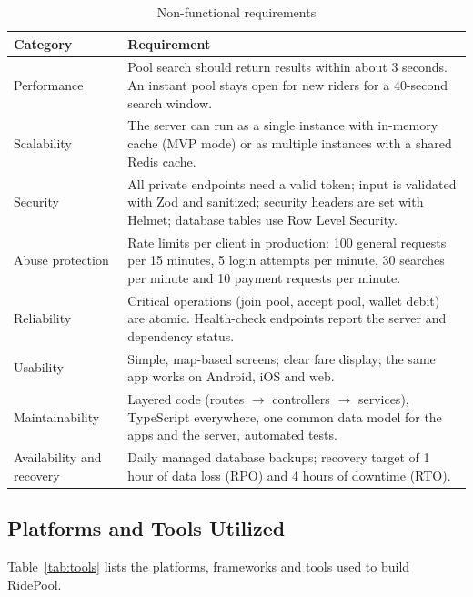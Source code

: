 \begin{table}[H]
  \centering
  \small
  \caption{Non-functional requirements}
  \label{tab:nonfunctional-req}
  \begin{tabularx}{\textwidth}{@{}lL@{}}
    \toprule
    \textbf{Category} & \textbf{Requirement} \\
    \midrule
    Performance      & Pool search should return results within about 3 seconds. An instant pool stays open for new riders for a 40-second search window. \\
    Scalability      & The server can run as a single instance with in-memory cache (MVP mode) or as multiple instances with a shared Redis cache. \\
    Security         & All private endpoints need a valid token; input is validated with Zod and sanitized; security headers are set with Helmet; database tables use Row Level Security. \\
    Abuse protection & Rate limits per client in production: 100 general requests per 15 minutes, 5 login attempts per minute, 30 searches per minute and 10 payment requests per minute. \\
    Reliability      & Critical operations (join pool, accept pool, wallet debit) are atomic. Health-check endpoints report the server and dependency status. \\
    Usability        & Simple, map-based screens; clear fare display; the same app works on Android, iOS and web. \\
    Maintainability  & Layered code (routes $\rightarrow$ controllers $\rightarrow$ services), TypeScript everywhere, one common data model for the apps and the server, automated tests. \\
    Availability and recovery & Daily managed database backups; recovery target of 1 hour of data loss (RPO) and 4 hours of downtime (RTO). \\
    \bottomrule
  \end{tabularx}
\end{table}

\subsection{Platforms and Tools Utilized}
\label{subsec:tools}

Table~\ref{tab:tools} lists the platforms, frameworks and tools used to build
RidePool.

